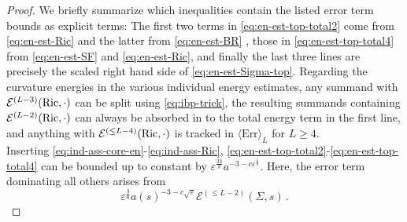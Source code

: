 \documentclass[11pt,leqno,textwidth=10cm]{amsart}
\numberwithin{equation}{section}
\theoremstyle{definition}
\theoremstyle{plain}
\newcommand{\1}{\mathbbm{1}}
\newcommand{\E}{\mathcal{E}}
\newcommand{\Ric}{\text{\normalfont{Ric}}}
\renewcommand{\epsilon}{\varepsilon}
\begin{document}
{\begin{proof}
We briefly summarize which inequalities contain the listed error term bounds as explicit terms: The first two terms in \eqref{eq:en-est-top-total2} come from \eqref{eq:en-est-Ric} and the latter from \eqref{eq:en-est-BR}%
, those in \eqref{eq:en-est-top-total4} from %
\eqref{eq:en-est-SF} and \eqref{eq:en-est-Ric}, and finally the last three lines are precisely the scaled right hand side of \eqref{eq:en-est-Sigma-top}. Regarding the curvature energies in the various individual energy estimates, any summand with $\E^{(L-3)}(\Ric,\cdot)$ can be split using \eqref{eq:ibp-trick}, the resulting summands containing $\E^{(L-2)}(\Ric,\cdot)$ can always be absorbed in to the total energy term in the first line, and anything with $\E^{(\leq L-4)}(\Ric,\cdot)$ is tracked in $\langle\text{Err}\rangle_L$ for $L\geq 4$.\\

\noindent Inserting \eqref{eq:ind-ass-core-en}-\eqref{eq:ind-ass-Ric}, \eqref{eq:en-est-top-total2}-\eqref{eq:en-est-top-total4} can be bounded up to constant by $\epsilon^\frac{33}8a^{-3-c\epsilon^\frac18}$. Here, the error term dominating all others arises from 
\[\epsilon^\frac38a(s)^{-3-c\sqrt{\epsilon}}\E^{(\leq L-2)}(\Sigma,s)\,.\]



\end{proof}}
\end{document}
